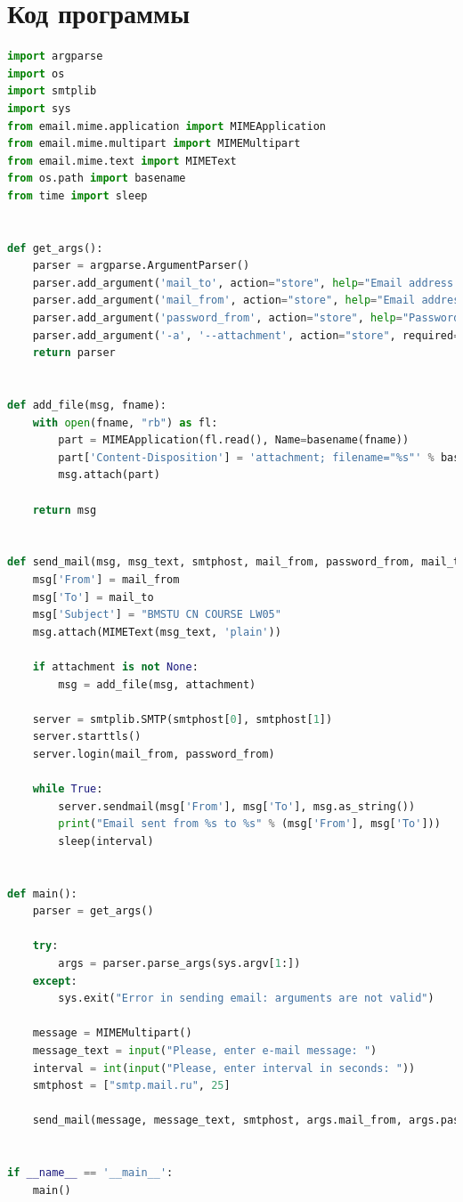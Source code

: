 \documentclass[12pt]{report}
\begin{document}
\section*{Код программы}


\begin{lstlisting}[label=lst:lab_04,caption=Реализация SMTP-клиента,language=python]
import argparse
import os
import smtplib
import sys
from email.mime.application import MIMEApplication
from email.mime.multipart import MIMEMultipart
from email.mime.text import MIMEText
from os.path import basename
from time import sleep


def get_args():
	parser = argparse.ArgumentParser()
	parser.add_argument('mail_to', action="store", help="Email address: to")
	parser.add_argument('mail_from', action="store", help="Email address: from")
	parser.add_argument('password_from', action="store", help="Password: from")
	parser.add_argument('-a', '--attachment', action="store", required=False, help="Attach file")
	return parser


def add_file(msg, fname):
	with open(fname, "rb") as fl:
		part = MIMEApplication(fl.read(), Name=basename(fname))
		part['Content-Disposition'] = 'attachment; filename="%s"' % basename(fname)
		msg.attach(part)

	return msg


def send_mail(msg, msg_text, smtphost, mail_from, password_from, mail_to, interval, attachment):
	msg['From'] = mail_from
	msg['To'] = mail_to
	msg['Subject'] = "BMSTU CN COURSE LW05"
	msg.attach(MIMEText(msg_text, 'plain'))
	
	if attachment is not None:
		msg = add_file(msg, attachment)
	
	server = smtplib.SMTP(smtphost[0], smtphost[1])
	server.starttls()
	server.login(mail_from, password_from)
	
	while True:
		server.sendmail(msg['From'], msg['To'], msg.as_string())
		print("Email sent from %s to %s" % (msg['From'], msg['To']))
		sleep(interval)


def main():
	parser = get_args()
	
	try:
		args = parser.parse_args(sys.argv[1:])
	except:
		sys.exit("Error in sending email: arguments are not valid")
	
	message = MIMEMultipart()
	message_text = input("Please, enter e-mail message: ")
	interval = int(input("Please, enter interval in seconds: "))
	smtphost = ["smtp.mail.ru", 25]
	
	send_mail(message, message_text, smtphost, args.mail_from, args.password_from, args.mail_to, interval, args.attachment)


if __name__ == '__main__':
	main()
\end{lstlisting}
\end{document}
